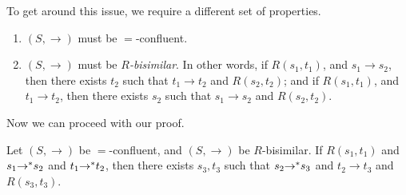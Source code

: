 \documentclass{easychair}
\begin{document}
To get around this issue, we require a different set of properties.
\begin{enumerate}
\item $(S,\rightarrow)$ must be $=$-confluent.
\item $(S,\rightarrow)$ must be \emph{$R$-bisimilar}. In other words,
  if $R(s_1,t_1)$, and $s_1 \rightarrow s_2$, then there exists $t_2$ such that
  $t_1 \rightarrow t_2$ and $R(s_2,t_2)$; and if $R(s_1,t_1)$, and $t_1
  \rightarrow t_2$, then there exists $s_2$ such that $s_1 \rightarrow s_2$ and
  $R(s_2,t_2)$.
\end{enumerate}

Now we can proceed with our proof.

\begin{theorem}
  \label{lem:right-side}
  Let $(S,\rightarrow)$ be $=$-confluent, and $(S,\rightarrow)$ be
  $R$-bisimilar. If $R(s_1,t_1)$ and $s_1 {\rightarrow}^* s_2$ and $t_1
  {\rightarrow}^* t_2$, then there exists $s_3,t_3$ such that $s_2
  {\rightarrow}^* s_3$ and $t_2 \rightarrow t_3$ and $R(s_3,t_3)$.
\end{theorem}
\end{document}
